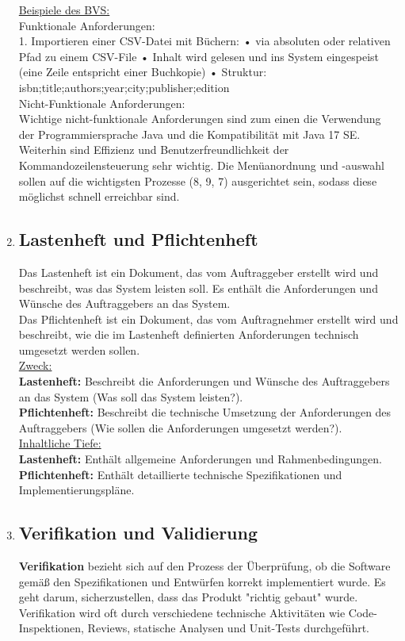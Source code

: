 \documentclass{article}
\begin{document}
\begin{enumerate}[label=\alph*)]
   \underline{Beispiele des BVS:}\\ Funktionale Anforderungen:\\
1. Importieren einer CSV-Datei mit Büchern:
• via absoluten oder relativen Pfad zu einem CSV-File
• Inhalt wird gelesen und ins System eingespeist (eine Zeile entspricht einer Buchkopie)
• Struktur: isbn;title;authors;year;city;publisher;edition\\
 Nicht-Funktionale Anforderungen:\\
Wichtige nicht-funktionale Anforderungen sind zum einen die Verwendung der Programmiersprache Java und die Kompatibilität mit Java 17 SE.
Weiterhin sind Effizienz und Benutzerfreundlichkeit der Kommandozeilensteuerung
sehr wichtig. Die Menüanordnung und -auswahl sollen auf die wichtigsten Prozesse
(8, 9, 7) ausgerichtet sein, sodass diese möglichst schnell erreichbar sind.

   \item \subsection*{Lastenheft und Pflichtenheft}
   Das Lastenheft ist ein Dokument, das vom Auftraggeber erstellt wird und beschreibt, was das System leisten soll. Es enthält die Anforderungen und Wünsche des Auftraggebers an das System.\\
   Das Pflichtenheft ist ein Dokument, das vom Auftragnehmer erstellt wird und beschreibt, wie die im Lastenheft definierten Anforderungen technisch umgesetzt werden sollen.\\
   
   \underline{Zweck:}\\
\textbf{Lastenheft:} Beschreibt die Anforderungen und Wünsche des Auftraggebers an das System (Was soll das System leisten?).\\
\textbf{Pflichtenheft:} Beschreibt die technische Umsetzung der Anforderungen des Auftraggebers (Wie sollen die Anforderungen umgesetzt werden?).\\

   \underline{Inhaltliche Tiefe:}\\
\textbf{Lastenheft:} Enthält allgemeine Anforderungen und Rahmenbedingungen.\\
\textbf{Pflichtenheft:} Enthält detaillierte technische Spezifikationen und Implementierungspläne.


\item \subsection*{Verifikation und Validierung}
\textbf{Verifikation} bezieht sich auf den Prozess der Überprüfung, ob die Software gemäß den Spezifikationen und Entwürfen korrekt implementiert wurde. Es geht darum, sicherzustellen, dass das Produkt "richtig gebaut" wurde. Verifikation wird oft durch verschiedene technische Aktivitäten wie Code-Inspektionen, Reviews, statische Analysen und Unit-Tests durchgeführt.\\


\end{enumerate}
\end{document}
